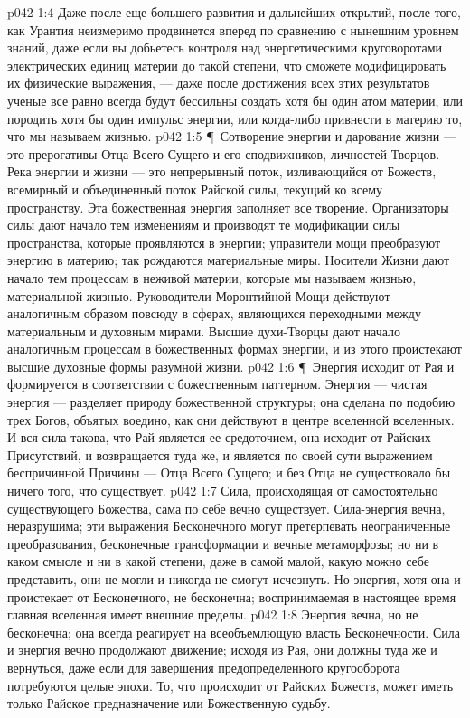 \vs p042 1:4 Даже после еще большего развития и дальнейших открытий, после того, как Урантия неизмеримо продвинется вперед по сравнению с нынешним уровнем знаний, даже если вы добьетесь контроля над энергетическими круговоротами электрических единиц материи до такой степени, что сможете модифицировать их физические выражения, --- даже после достижения всех этих результатов ученые все равно всегда будут бессильны создать хотя бы один атом материи, или породить хотя бы один импульс энергии, или когда\hyp{}либо привнести в материю то, что мы называем жизнью.
\vs p042 1:5 \P\ Сотворение энергии и дарование жизни --- это прерогативы Отца Всего Сущего и его сподвижников, личностей\hyp{}Творцов. Река энергии и жизни --- это непрерывный поток, изливающийся от Божеств, всемирный и объединенный поток Райской силы, текущий ко всему пространству. Эта божественная энергия заполняет все творение. Организаторы силы дают начало тем изменениям и производят те модификации силы пространства, которые проявляются в энергии; управители мощи преобразуют энергию в материю; так рождаются материальные миры. Носители Жизни дают начало тем процессам в неживой материи, которые мы называем жизнью, материальной жизнью. Руководители Моронтийной Мощи действуют аналогичным образом повсюду в сферах, являющихся переходными между материальным и духовным мирами. Высшие духи\hyp{}Творцы дают начало аналогичным процессам в божественных формах энергии, и из этого проистекают высшие духовные формы разумной жизни.
\vs p042 1:6 \P\ Энергия исходит от Рая и формируется в соответствии с божественным паттерном. Энергия --- чистая энергия --- разделяет природу божественной структуры; она сделана по подобию трех Богов, объятых воедино, как они действуют в центре вселенной вселенных. И вся сила такова, что Рай является ее средоточием, она исходит от Райских Присутствий, и возвращается туда же, и является по своей сути выражением беспричинной Причины --- Отца Всего Сущего; и без Отца не существовало бы ничего того, что существует.
\vs p042 1:7 Сила, происходящая от самостоятельно существующего Божества, сама по себе вечно существует. Сила\hyp{}энергия вечна, неразрушима; эти выражения Бесконечного могут претерпевать неограниченные преобразования, бесконечные трансформации и вечные метаморфозы; но ни в каком смысле и ни в какой степени, даже в самой малой, какую можно себе представить, они не могли и никогда не смогут исчезнуть. Но энергия, хотя она и проистекает от Бесконечного, не бесконечна; воспринимаемая в настоящее время главная вселенная имеет внешние пределы.
\vs p042 1:8 Энергия вечна, но не бесконечна; она всегда реагирует на всеобъемлющую власть Бесконечности. Сила и энергия вечно продолжают движение; исходя из Рая, они должны туда же и вернуться, даже если для завершения предопределенного кругооборота потребуются целые эпохи. То, что происходит от Райских Божеств, может иметь только Райское предназначение или Божественную судьбу.
